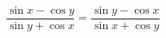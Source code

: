 \begin{ex}[type=prove_identity]
	\begin{condition}
		\( \dfrac{\sin x - \cos y}{\sin y + \cos x}=\dfrac{\sin y - \cos x}{\sin x + \cos y} \)
	\end{condition}
\end{ex}